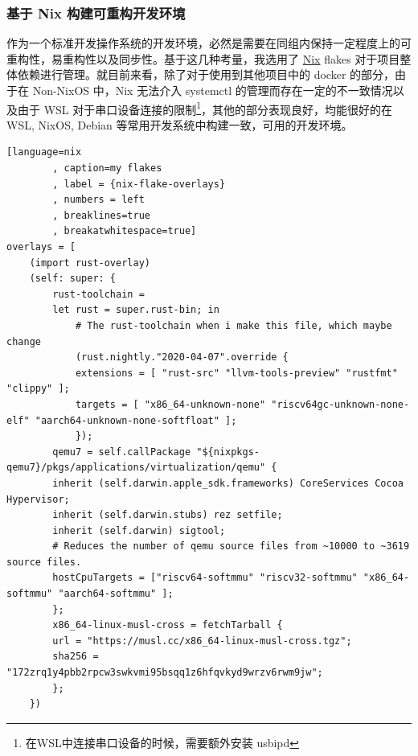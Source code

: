     \subsubsection{基于 Nix 构建可重构开发环境}

    作为一个标准开发操作系统的开发环境，必然是需要在同组内保持一定程度上的可重构性，易重构性以及同步性。基于这几种考量，我选用了 \href{https://nixos.org/}{Nix} flakes 对于项目整体依赖进行管理。就目前来看，除了对于使用到其他项目中的 docker 的部分，由于在 Non-NixOS 中，Nix 无法介入 systemctl 的管理而存在一定的不一致情况以及由于 WSL 对于串口设备连接的限制\footnote{在WSL中连接串口设备的时候，需要额外安装 usbipd}，其他的部分表现良好，均能很好的在 WSL, NixOS, Debian 等常用开发系统中构建一致，可用的开发环境。

    
    \begin{lstlisting}[language=nix
        , caption=my flakes
        , label = {nix-flake-overlays}
        , numbers = left
        , breaklines=true
        , breakatwhitespace=true]
overlays = [ 
    (import rust-overlay)
    (self: super: {
        rust-toolchain =
        let rust = super.rust-bin; in
            # The rust-toolchain when i make this file, which maybe change
            (rust.nightly."2020-04-07".override {
            extensions = [ "rust-src" "llvm-tools-preview" "rustfmt" "clippy" ];
            targets = [ "x86_64-unknown-none" "riscv64gc-unknown-none-elf" "aarch64-unknown-none-softfloat" ];
            });
        qemu7 = self.callPackage "${nixpkgs-qemu7}/pkgs/applications/virtualization/qemu" {
        inherit (self.darwin.apple_sdk.frameworks) CoreServices Cocoa Hypervisor;
        inherit (self.darwin.stubs) rez setfile;
        inherit (self.darwin) sigtool;
        # Reduces the number of qemu source files from ~10000 to ~3619 source files.
        hostCpuTargets = ["riscv64-softmmu" "riscv32-softmmu" "x86_64-softmmu" "aarch64-softmmu" ];
        };
        x86_64-linux-musl-cross = fetchTarball {
        url = "https://musl.cc/x86_64-linux-musl-cross.tgz";
        sha256 = "172zrq1y4pbb2rpcw3swkvmi95bsqq1z6hfqvkyd9wrzv6rwm9jw";
        };
    })
    \end{lstlisting}

